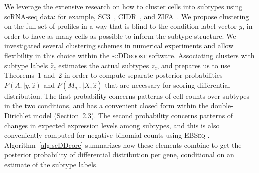 \documentclass[aoas,preprint]{imsart}
\begin{document}
We leverage the extensive research on how to cluster cells into subtypes using scRNA-seq data:
for example,  SC3~\citep{sc3}, CIDR~\citep{CIDR}, and ZIFA~\citep{ZIFA}.   We propose clustering on the full set
of profiles in a way that is blind to the condition label vector $y$, in order to have as many cells as possible
to inform the subtype structure.  We investigated several clustering schemes in numerical experiments and allow 
flexibility in this choice within the \textsc{scDDboost} software. 
Associating clusters with subtype labels $\hat z_c$  estimates
the actual subtypes $z_c$, and prepares us to use Theorems~1 and~2 in order to compute separate
posterior probabilities $P(A_\pi|y, \hat z)$ and $P(M_{g, \pi}| X, \hat z)$ that are necessary for scoring
differential distribution. The first probability concerns patterns of cell counts over subtypes in the two conditions,
and has a convenient closed form within the double-Dirichlet model (Section~2.3).
The second probability concerns patterns of changes in expected expression levels among subtypes, and this is
also conveniently computed for negative-binomial counts using \textsc{EBSeq} \citep{ref:Leng}. 
Algorithm~\ref{alg:scDDcore}
summarizes how these elements combine to get the posterior probability of differential distribution per gene,
conditional on an estimate of the subtype labels.


\end{document}
